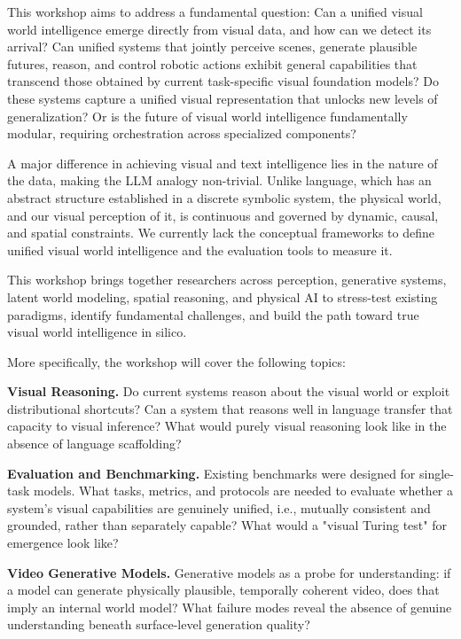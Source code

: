 \documentclass[11pt]{article}
\begin{document}
This workshop aims to address a fundamental question: Can a unified visual world intelligence emerge directly from visual data, and how can we detect its arrival? Can unified systems that jointly perceive scenes, generate plausible futures, reason, and control robotic actions exhibit general capabilities that transcend those obtained by current task-specific visual foundation models? Do these systems capture a unified visual representation that unlocks new levels of generalization? Or is the future of visual world intelligence fundamentally modular, requiring orchestration across specialized components?


A major difference in achieving visual and text intelligence lies in the nature of the data, making the LLM analogy non-trivial. Unlike language, which has an abstract structure established in a discrete symbolic system, the physical world, and our visual perception of it, is continuous and governed by dynamic, causal, and spatial constraints. We currently lack the conceptual frameworks to define unified visual world intelligence and the evaluation tools to measure it.


This workshop brings together researchers across perception, generative systems, latent world modeling, spatial reasoning, and physical AI to stress-test existing paradigms, identify fundamental challenges, and build the path toward true visual world intelligence in silico.


More specifically, the workshop will cover the following topics:


\textbf{Visual Reasoning.} Do current systems reason about the visual world or exploit distributional shortcuts? Can a system that reasons well in language transfer that capacity to visual inference? What would purely visual reasoning look like in the absence of language scaffolding?


\textbf{Evaluation and Benchmarking.} Existing benchmarks were designed for single-task models. What tasks, metrics, and protocols are needed to evaluate whether a system's visual capabilities are genuinely unified, i.e., mutually consistent and grounded, rather than separately capable? What would a "visual Turing test" for emergence look like?


\textbf{Video Generative Models.} Generative models as a probe for understanding: if a model can generate physically plausible, temporally coherent video, does that imply an internal world model? What failure modes reveal the absence of genuine understanding beneath surface-level generation quality?
\end{document}
